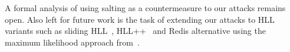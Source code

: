 \documentclass[11pt]{article}
\begin{document}
A formal analysis of using salting as a countermeasure to our attacks remains open.
Also left for future work is the task of extending our attacks to HLL variants such as sliding HLL~\cite{slidinghll}, HLL++~\cite{hllpratice} and Redis alternative using the maximum likelihood approach from~\cite{newhll}.




\end{document}
